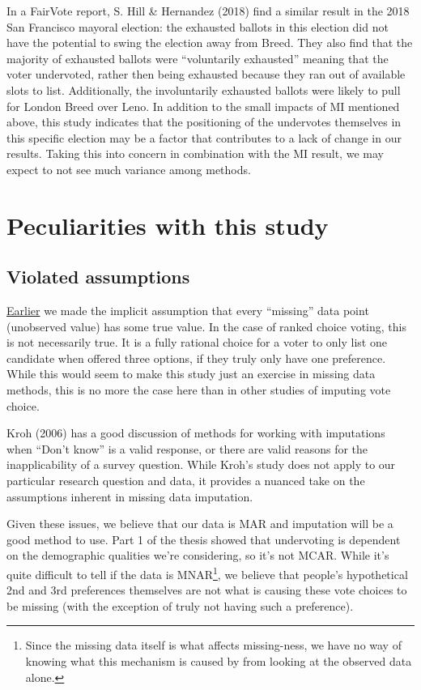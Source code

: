\documentclass[12pt,twoside]{reedthesis}
\begin{document}
In a FairVote report, S. Hill \& Hernandez (2018) find a similar result in the 2018 San Francisco mayoral election: the exhausted ballots in this election did not have the potential to swing the election away from Breed. They also find that the majority of exhausted ballots were ``voluntarily exhausted'' meaning that the voter undervoted, rather then being exhausted because they ran out of available slots to list. Additionally, the involuntarily exhausted ballots were likely to pull for London Breed over Leno. In addition to the small impacts of MI mentioned above, this study indicates that the positioning of the undervotes themselves in this specific election may be a factor that contributes to a lack of change in our results. Taking this into concern in combination with the MI result, we may expect to not see much variance among methods.

\hypertarget{peculiarities-with-this-study}{%
\section{Peculiarities with this study}\label{peculiarities-with-this-study}}

\hypertarget{violated-assumptions}{%
\subsection{Violated assumptions}\label{violated-assumptions}}

\protect\hyperlink{missing-data}{Earlier} we made the implicit assumption that every ``missing'' data point (unobserved value) has some true value. In the case of ranked choice voting, this is not necessarily true. It is a fully rational choice for a voter to only list one candidate when offered three options, if they truly only have one preference. While this would seem to make this study just an exercise in missing data methods, this is no more the case here than in other studies of imputing vote choice.

Kroh (2006) has a good discussion of methods for working with imputations when ``Don't know'' is a valid response, or there are valid reasons for the inapplicability of a survey question. While Kroh's study does not apply to our particular research question and data, it provides a nuanced take on the assumptions inherent in missing data imputation.

Given these issues, we believe that our data is MAR and imputation will be a good method to use. Part 1 of the thesis showed that undervoting is dependent on the demographic qualities we're considering, so it's not MCAR. While it's quite difficult to tell if the data is MNAR\footnote{Since the missing data itself is what affects missing-ness, we have no way of knowing what this mechanism is caused by from looking at the observed data alone.}, we believe that people's hypothetical 2nd and 3rd preferences themselves are not what is causing these vote choices to be missing (with the exception of truly not having such a preference).
\end{document}
